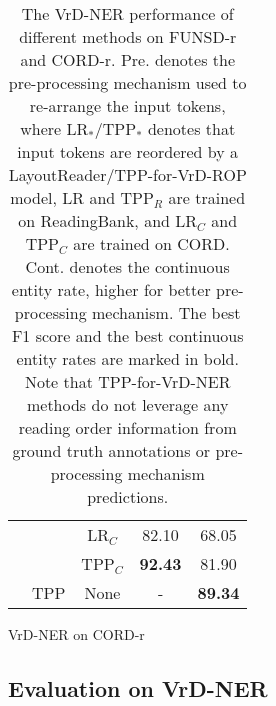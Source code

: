 \documentclass[11pt]{article}
\begin{document}
\begin{table*}[t]
\begin{spacing}{1.19}
\begin{subtable}[h]{0.49\linewidth}
\begin{tabular}{c|c|c|cc}
         & & LR$_C$ & 82.10 & 68.05 \\
         & & TPP$_C$ & \textbf{92.43} & 81.90 \\
        \cline{2-5}
         & TPP & None & - & \textbf{89.34} \\
        \toprule
    \end{tabular}
    \caption{VrD-NER on CORD-r}    
\end{subtable}
\end{spacing}
\caption{The VrD-NER performance of different methods on FUNSD-r and CORD-r. 
Pre. denotes the pre-processing mechanism used to re-arrange the input tokens, where LR$_*$/TPP$_*$ denotes that input tokens are reordered by a LayoutReader/TPP-for-VrD-ROP model, LR and TPP$_R$ are trained on ReadingBank, and LR$_C$ and TPP$_C$ are trained on CORD. 
Cont. denotes the continuous entity rate, higher for better pre-processing mechanism. The best F1 score and the best continuous entity rates are marked in bold. 
Note that TPP-for-VrD-NER methods do not leverage any reading order information from ground truth annotations or pre-processing mechanism predictions. 
}
\label{tab:main}
\end{table*}

\subsection{Evaluation on VrD-NER}
\end{document}
